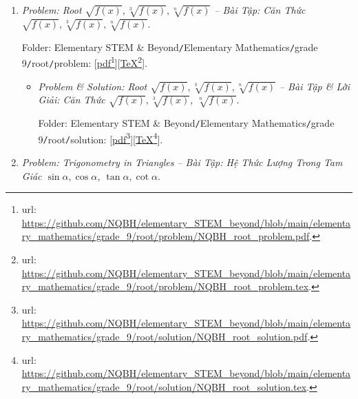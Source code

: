 \documentclass[12pt]{article}
\begin{document}
\begin{enumerate}
\begin{itemize}
		Folder: {\sf Elementary STEM \& Beyond{\tt/}Elementary Mathematics{\tt/}grade 9{\tt/}1st-order inequation{\tt/}solution}: [\href{https://github.com/NQBH/elementary_STEM_beyond/blob/main/elementary_mathematics/grade_9/1st_order_inequation/solution/NQBH_1st_order_inequation_solution.pdf}{pdf}\footnote{{\sc url}: \url{https://github.com/NQBH/elementary_STEM_beyond/blob/main/elementary_mathematics/grade_9/1st_order_inequation/solution/NQBH_1st_order_inequation_solution.pdf}.}][\href{https://github.com/NQBH/elementary_STEM_beyond/blob/main/elementary_mathematics/grade_9/1st_order_inequation/solution/NQBH_1st_order_inequation_solution.tex}{\TeX}\footnote{{\sc url}: \url{https://github.com/NQBH/elementary_STEM_beyond/blob/main/elementary_mathematics/grade_9/1st_order_inequation/solution/NQBH_1st_order_inequation_solution.tex}.}].
	\end{itemize}
	\item {\it Problem: Root $\sqrt{f(x)},\sqrt[3]{f(x)},\sqrt[n]{f(x)}$ -- Bài Tập: Căn Thức $\sqrt{f(x)},\sqrt[3]{f(x)},\sqrt[n]{f(x)}$}.
	
	Folder: {\sf Elementary STEM \& Beyond{\tt/}Elementary Mathematics{\tt/}grade 9{\tt/}root{\tt/}problem}: [\href{https://github.com/NQBH/elementary_STEM_beyond/blob/main/elementary_mathematics/grade_9/root/problem/NQBH_root_problem.pdf}{pdf}\footnote{{\sc url}: \url{https://github.com/NQBH/elementary_STEM_beyond/blob/main/elementary_mathematics/grade_9/root/problem/NQBH_root_problem.pdf}.}][\href{https://github.com/NQBH/elementary_STEM_beyond/blob/main/elementary_mathematics/grade_9/root/problem/NQBH_root_problem.tex}{\TeX}\footnote{{\sc url}: \url{https://github.com/NQBH/elementary_STEM_beyond/blob/main/elementary_mathematics/grade_9/root/problem/NQBH_root_problem.tex}.}].
	\begin{itemize}
		\item {\it Problem \& Solution: Root $\sqrt{f(x)},\sqrt[3]{f(x)},\sqrt[n]{f(x)}$ -- Bài Tập \& Lời Giải: Căn Thức $\sqrt{f(x)},\sqrt[3]{f(x)}$, $\sqrt[n]{f(x)}$}.
		
		Folder: {\sf Elementary STEM \& Beyond{\tt/}Elementary Mathematics{\tt/}grade 9{\tt/}root{\tt/}solution}: [\href{https://github.com/NQBH/elementary_STEM_beyond/blob/main/elementary_mathematics/grade_9/root/solution/NQBH_root_solution.pdf}{pdf}\footnote{{\sc url}: \url{https://github.com/NQBH/elementary_STEM_beyond/blob/main/elementary_mathematics/grade_9/root/solution/NQBH_root_solution.pdf}.}][\href{https://github.com/NQBH/elementary_STEM_beyond/blob/main/elementary_mathematics/grade_9/root/solution/NQBH_root_solution.tex}{\TeX}\footnote{{\sc url}: \url{https://github.com/NQBH/elementary_STEM_beyond/blob/main/elementary_mathematics/grade_9/root/solution/NQBH_root_solution.tex}.}].
	\end{itemize}	
	\item {\it Problem: Trigonometry in Triangles -- Bài Tập: Hệ Thức Lượng Trong Tam Giác $\sin\alpha,\cos\alpha$, $\tan\alpha,\cot\alpha$}.
	

\end{enumerate}
\end{document}
